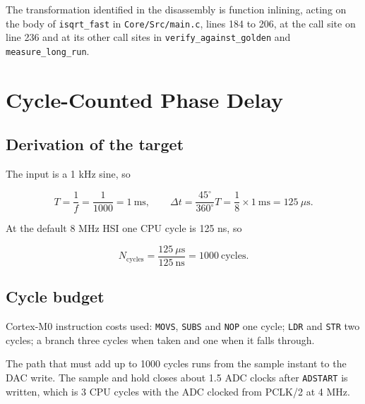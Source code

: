 \documentclass[11pt]{article}
\begin{document}
The transformation identified in the disassembly is function inlining, acting on
the body of \texttt{isqrt\_fast} in \texttt{Core/Src/main.c}, lines 184 to 206,
at the call site on line 236 and at its other call sites in
\texttt{verify\_against\_golden} and \texttt{measure\_long\_run}.

\clearpage
\section{Cycle-Counted Phase Delay}

\subsection{Derivation of the target}

The input is a 1 kHz sine, so

\[
T = \frac{1}{f} = \frac{1}{1000} = 1~\text{ms},
\qquad
\Delta t = \frac{45^{\circ}}{360^{\circ}} T = \frac{1}{8} \times 1~\text{ms} = 125~\mu\text{s}.
\]

At the default 8 MHz HSI one CPU cycle is 125 ns, so

\[
N_{\text{cycles}} = \frac{125~\mu\text{s}}{125~\text{ns}} = 1000~\text{cycles}.
\]

\subsection{Cycle budget}

Cortex-M0 instruction costs used: \texttt{MOVS}, \texttt{SUBS} and \texttt{NOP}
one cycle; \texttt{LDR} and \texttt{STR} two cycles; a branch three cycles when
taken and one when it falls through.

The path that must add up to 1000 cycles runs from the sample instant to the
DAC write. The sample and hold closes about 1.5 ADC clocks after \texttt{ADSTART}
is written, which is 3 CPU cycles with the ADC clocked from PCLK/2 at 4 MHz.
\end{document}

